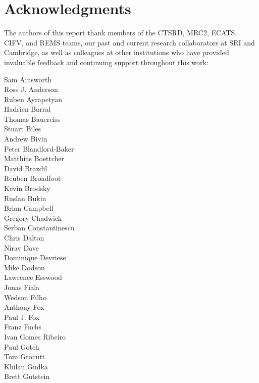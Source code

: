 \section*{Acknowledgments}

\vspace{-0.2cm}

The authors of this report thank members of the CTSRD, MRC2, ECATS,
CIFV, and REMS teams, our past and current research collaborators at SRI and
Cambridge, as well as colleagues at other institutions who have provided
invaluable feedback and continuing support throughout this work:

\medskip

\begin{small}
\noindent\begin{autogrid}{4}
Sam Ainsworth \\
Ross J. Anderson \\
Ruben Ayrapetyan \\
Hadrien Barral \\
Thomas Bauereiss \\
Stuart Biles \\
Andrew Bivin \\
Peter Blandford-Baker \\
Matthias Boettcher \\
David Brazdil \\
Reuben Broadfoot \\
Kevin Brodsky \\
Ruslan Bukin \\
Brian Campbell \\
Gregory Chadwick \\
Serban Constantinescu \\
Chris Dalton \\
Nirav Dave \\
Dominique Devriese \\
Mike Dodson \\
Lawrence Esswood \\
Jonas Fiala \\
Wedson Filho \\
Anthony Fox \\
Paul J. Fox \\
Franz Fuchs \\
Ivan Gomes Ribeiro \\
Paul Gotch \\
Tom Grocutt \\
Khilan Gudka \\
Brett Gutstein \\

\end{autogrid}
\end{small}
